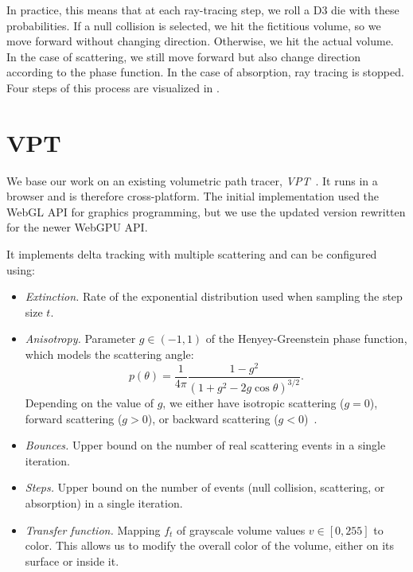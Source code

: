 In practice, this means that at each ray-tracing step, we roll a D3 die with
these probabilities. If a null collision is selected, we hit the fictitious
volume, so we move forward without changing direction. Otherwise, we hit the
actual volume. In the case of scattering, we still move forward but also change
direction according to the phase function. In the case of absorption, ray 
tracing is stopped. Four steps of this process are visualized in
.

\section{VPT}

We base our work on an existing volumetric path tracer,
\emph{VPT}~\cite{lesar_real-time_2018}. It runs in a browser and is therefore
cross-platform. The initial implementation used the WebGL API for graphics
programming, but we use the updated version rewritten for the newer WebGPU API.

It implements delta tracking with multiple scattering and can be configured using:
\begin{itemize}
    \item \emph{Extinction.} Rate of the exponential distribution used when
    sampling the step size $t$.

    \item \emph{Anisotropy.} Parameter $g \in (-1, 1)$ of the Henyey-Greenstein
    phase function, which models the scattering angle:
    \begin{equation}
        p(\theta) = \frac{1}{4\pi}
            \frac{1 - g^2}{(1 + g^2 - 2g\cos\theta)^{3/2}}.
    \end{equation}
    Depending on the value of $g$, we either have isotropic scattering ($g = 0$),
    forward scattering ($g > 0$), or backward scattering
    ($g < 0$)~\cite{fong_production_2017}.

    \item \emph{Bounces.} Upper bound on the number of real scattering events
    in a single iteration.
    
    \item \emph{Steps.} Upper bound on the number of events (null collision,
    scattering, or absorption) in a single iteration.

    \item \emph{Transfer function.} Mapping $f_t$ of grayscale volume values
    $v \in [0, 255]$ to color. This allows us to modify the overall color of
    the volume, either on its surface or inside it.
\end{itemize}

